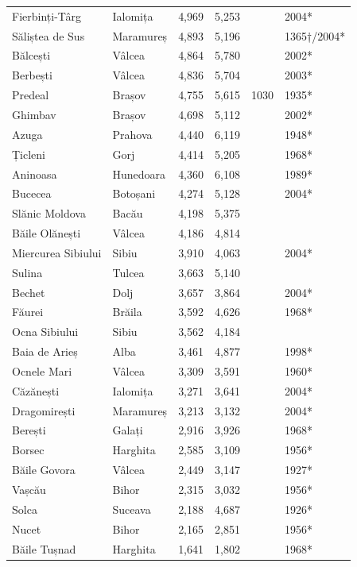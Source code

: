 \documentclass{article}
\begin{document}
\begin{tabular}{llllll}
Fierbinți-Târg & Ialomița & 4,969 & 5,253 &  & 2004* \\
Săliștea de Sus & Maramureș & 4,893 & 5,196 &  & 1365†/2004* \\
Bălcești & Vâlcea & 4,864 & 5,780 &  & 2002* \\
Berbești & Vâlcea & 4,836 & 5,704 &  & 2003* \\
Predeal & Brașov & 4,755 & 5,615 & 1030 & 1935* \\
Ghimbav & Brașov & 4,698 & 5,112 &  & 2002* \\
Azuga & Prahova & 4,440 & 6,119 &  & 1948* \\
Țicleni & Gorj & 4,414 & 5,205 &  & 1968* \\
Aninoasa & Hunedoara & 4,360 & 6,108 &  & 1989* \\
Bucecea & Botoșani & 4,274 & 5,128 &  & 2004* \\
Slănic Moldova & Bacău & 4,198 & 5,375 &  &  \\
Băile Olănești & Vâlcea & 4,186 & 4,814 &  &  \\
Miercurea Sibiului & Sibiu & 3,910 & 4,063 &  & 2004* \\
Sulina & Tulcea & 3,663 & 5,140 &  &  \\
Bechet & Dolj & 3,657 & 3,864 &  & 2004* \\
Făurei & Brăila & 3,592 & 4,626 &  & 1968* \\
Ocna Sibiului & Sibiu & 3,562 & 4,184 &  &  \\
Baia de Arieș & Alba & 3,461 & 4,877 &  & 1998* \\
Ocnele Mari & Vâlcea & 3,309 & 3,591 &  & 1960* \\
Căzănești & Ialomița & 3,271 & 3,641 &  & 2004* \\
Dragomirești & Maramureș & 3,213 & 3,132 &  & 2004* \\
Berești & Galați & 2,916 & 3,926 &  & 1968* \\
Borsec & Harghita & 2,585 & 3,109 &  & 1956* \\
Băile Govora & Vâlcea & 2,449 & 3,147 &  & 1927* \\
Vașcău & Bihor & 2,315 & 3,032 &  & 1956* \\
Solca & Suceava & 2,188 & 4,687 &  & 1926* \\
Nucet & Bihor & 2,165 & 2,851 &  & 1956* \\
Băile Tușnad & Harghita & 1,641 & 1,802 &  & 1968* \\
\bottomrule
\end{tabular}
\end{document}
